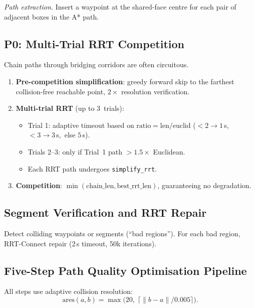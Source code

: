 \documentclass[journal]{IEEEtran}
\begin{document}
\emph{Path extraction.}
Insert a waypoint at the shared-face centre for each pair of
adjacent boxes in the A* path.

\subsection{P0: Multi-Trial RRT Competition}

Chain paths through bridging corridors are often circuitous.

\begin{enumerate}[nosep]
  \item \textbf{Pre-competition simplification}: greedy forward skip
    to the farthest collision-free reachable point, $2{\times}$
    resolution verification.
  \item \textbf{Multi-trial RRT} (up to 3~trials):
  \begin{itemize}[nosep]
    \item Trial 1: adaptive timeout based on
      $\text{ratio} = \text{len}/\text{euclid}$
      ($<2 \to 1\,$s,\ $<3 \to 3\,$s,\ else $5\,$s).
    \item Trials 2--3: only if Trial~1 path $> 1.5{\times}$ Euclidean.
    \item Each RRT path undergoes \texttt{simplify\_rrt}.
  \end{itemize}
  \item \textbf{Competition}: $\min(\text{chain\_len},
    \text{best\_rrt\_len})$, guaranteeing no degradation.
\end{enumerate}

\subsection{Segment Verification and RRT Repair}

Detect colliding waypoints or segments (``bad regions'').
For each bad region, RRT-Connect repair (2\,s timeout, 50k iterations).

\subsection{Five-Step Path Quality Optimisation Pipeline}

All steps use adaptive collision resolution:
\begin{equation}
  \text{ares}(a,b) = \max\!\bigl(20,\;\lceil\|b-a\|/0.005\rceil\bigr).
\end{equation}
\end{document}
